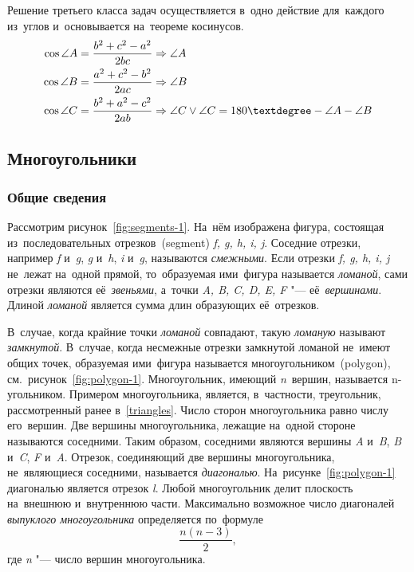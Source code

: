 \documentclass[]{scrartcl}
\begin{document}
Решение третьего класса задач осуществляется в~одно действие для~каждого из~углов и~основывается на~теореме косинусов.
\begin{equation}\label{eq:triangle-solving-6}
\begin{aligned}
\cos \angle A &= \frac{b^2+c^2-a^2}{2bc} \Rightarrow \angle A\\
\cos \angle B &= \frac{a^2+c^2-b^2}{2ac} \Rightarrow \angle B\\
\cos \angle C &= \frac{b^2+a^2-c^2}{2ab} \Rightarrow \angle C \vee \angle C = 180 \textdegree - \angle A - \angle B \\
\end{aligned}
\end{equation}

\subsection{Многоугольники}

\subsubsection{Общие сведения}

Рассмотрим рисунок~\ref{fig:segments-1}. На~нём изображена фигура, состоящая из~последовательных отрезков~(\foreignlanguage{english}{segment}) \textit{f, g, h, i, j}. Соседние отрезки, например \textit{f} и~\textit{g}, \textit{g} и~\textit{h}, \textit{i} и~\textit{g}, называются \emph{смежными}. Если отрезки \textit{f, g, h, i, j} не~лежат на~одной прямой, то~образуемая ими~фигура называется \emph{ломаной}, сами отрезки являются её~\emph{звеньями}, а~точки \textit{A, B, C, D, E, F} "--- её~\emph{вершинами}. Длиной \emph{ломаной} является сумма длин образующих её~отрезков.

В~случае, когда крайние точки \emph{ломаной} совпадают, такую \emph{ломаную} называют \emph{замкнутой}. В~случае, когда несмежные отрезки замкнутой ломаной не~имеют общих точек, образуемая ими~фигура называется многоугольником~(\foreignlanguage{english}{polygon}), см.~рисунок~\ref{fig:polygon-1}. Многоугольник, имеющий \textit{n}~вершин, называется n-угольником. Примером многоугольника, является, в~частности, треугольник, рассмотренный ранее в~\ref{triangles}. Число сторон многоугольника равно числу его~вершин. Две вершины многоугольника, лежащие на~одной стороне называются  соседними. Таким образом, соседними являются вершины \textit{A} и~\textit{B}, \textit{B} и~\textit{C}, \textit{F} и~\textit{A}. Отрезок, соединяющий две вершины многоугольника, не~являющиеся соседними, называется \emph{диагональю}. На~рисунке~\ref{fig:polygon-1} диагональю является отрезок \textit{l}. Любой многоугольник делит плоскость на~внешнюю и~внутреннюю части. Максимально возможное число диагоналей \emph{выпуклого многоугольника} определяется по~формуле
\begin{equation}\label{eq:n-polygon-vertex}
\frac{n(n-3)}{2},
\end{equation}
где \textit{n} "--- число вершин многоугольника.
\end{document}
